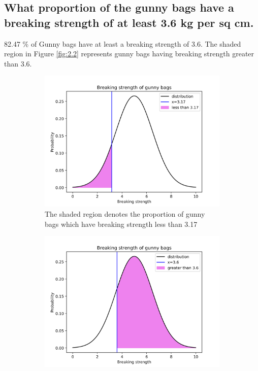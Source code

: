 \documentclass[12pt,a4paper]{style}
\begin{document}
	\subsection{What proportion of the gunny bags have a breaking strength of at least 3.6 kg per sq cm.}
	82.47 \% of Gunny bags have at least a breaking strength of 3.6. The shaded region in Figure \ref{fig:2.2} represents gunny bags having breaking strength greater than 3.6. 
	\begin{figure}[h]
		\centering
		\begin{subfigure}[t]{0.45\textwidth}
			\includegraphics[width=\textwidth]{2_1.png}
			\caption{The shaded region denotes the proportion  of gunny bags which have breaking strength less than 3.17}
			\label{fig:2.1}
		\end{subfigure}
		\hfill
		\begin{subfigure}[t]{0.45\textwidth}
			\includegraphics[width=\textwidth]{2_2.png}

\end{subfigure}
\end{figure}
\end{document}
